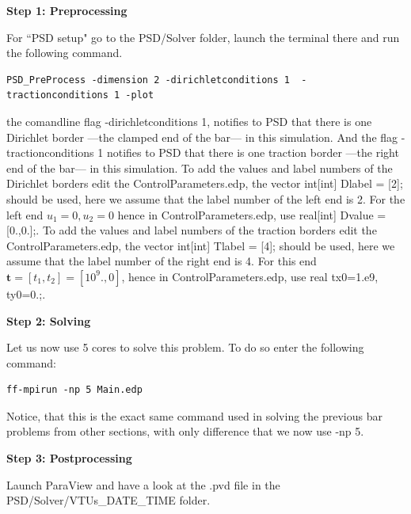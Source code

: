 \documentclass{report}
\begin{document}
\textbf{Step 1: Preprocessing}

For ``PSD setup" go to the {\ttfamily PSD/Solver} folder, launch the terminal there and run the following command.
\begin{lstlisting}[style=Linux]
PSD_PreProcess -dimension 2 -dirichletconditions 1  -tractionconditions 1 -plot
\end{lstlisting}
%
the comandline flag {\ttfamily -dirichletconditions 1}, notifies to PSD that there is one Dirichlet border ---the clamped end of the bar--- in this simulation. And the flag {\ttfamily -tractionconditions 1} notifies to PSD that there is one traction border ---the right end of the bar--- in this simulation. 
To add the values and label numbers of the Dirichlet borders edit the  {\ttfamily ControlParameters.edp},  the vector {\ttfamily int[int] Dlabel = [2];} should be used, here we assume that the label number of the left end is 2. For the left end $u_1=0,u_2=0$ hence in {\ttfamily ControlParameters.edp}, use {\ttfamily real[int]   Dvalue = [0.,0.];}. To add the values and label numbers of the traction borders edit the  {\ttfamily ControlParameters.edp},  the vector {\ttfamily int[int] Tlabel = [4];} should be used, here we assume that the label number of the right end is 4. For this end $\mathbf t=[t_1,t_2]=[10^9.,0]$, hence in {\ttfamily ControlParameters.edp}, use {\ttfamily real  tx0=1.e9, ty0=0.;}. 


\textbf{Step 2: Solving}

Let us now use 5 cores to solve this problem. To do so enter the following command:

\begin{lstlisting}[style=Linux]
ff-mpirun -np 5 Main.edp
\end{lstlisting}
%
Notice, that this is the exact same command used in solving the previous bar problems from other sections, with only difference that we now use {\ttfamily -np 5}.


\textbf{Step 3: Postprocessing}

Launch ParaView and have a look at the  {\ttfamily .pvd} file in the  {\ttfamily PSD/Solver/VTUs\_DATE\_TIME} folder. 
\end{document}
